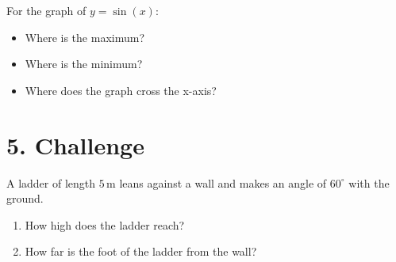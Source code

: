 \documentclass[a4paper,11pt]{article}
\begin{document}
For the graph of $y=\sin(x)$:
\begin{itemize}
\item Where is the maximum?
\item Where is the minimum?
\item Where does the graph cross the x-axis?
\end{itemize}

\section*{5. Challenge}

A ladder of length $5\,\mathrm{m}$ leans against a wall and makes an angle of
$60^\circ$ with the ground.

\begin{enumerate}
\item How high does the ladder reach?
\item How far is the foot of the ladder from the wall?
\end{enumerate}
\end{document}
